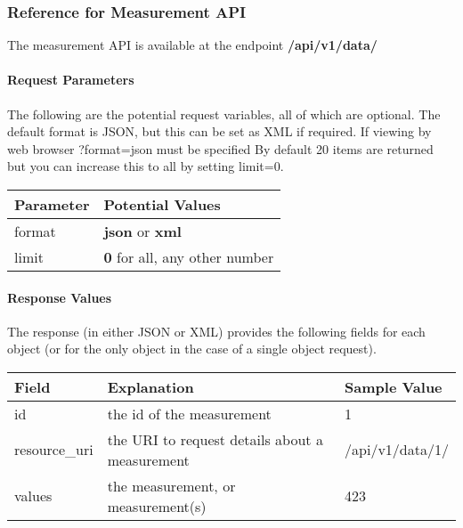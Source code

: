 \documentclass[letterpaper,10pt,english]{sphinxmanual}
\begin{document}
\subsubsection{Reference for Measurement API}
\label{data:reference-for-measurement-api}
The measurement API is available at the endpoint \textbf{/api/v1/data/}


\paragraph{Request Parameters}
\label{data:request-parameters}
The following are the potential request variables, all of which are optional.  
The default format is JSON, but this can be set as XML if required.
If viewing by web browser ?format=json must be specified  
By default 20 items are returned but you can increase this to all by setting limit=0.

\begin{tabulary}{\linewidth}{|L|L|}
\hline
\textbf{
Parameter
} & \textbf{
Potential Values
}\\\hline

format
 & 
\textbf{json} or \textbf{xml}
\\\hline

limit
 & 
\textbf{0} for all, any other number
\\\hline
\end{tabulary}



\paragraph{Response Values}
\label{data:response-values}
The response (in either JSON or XML) provides the following fields for each object (or for the only object in the case of a single object request).

\begin{tabulary}{\linewidth}{|L|L|L|}
\hline
\textbf{
Field
} & \textbf{
Explanation
} & \textbf{
Sample Value
}\\\hline

id
 & 
the id of the measurement
 & 
1
\\\hline

resource\_uri
 & 
the URI to request details about a measurement
 & 
/api/v1/data/1/
\\\hline

values
 & 
the measurement, or measurement(s)
 & 
423
\\\hline
\end{tabulary}
\end{document}
